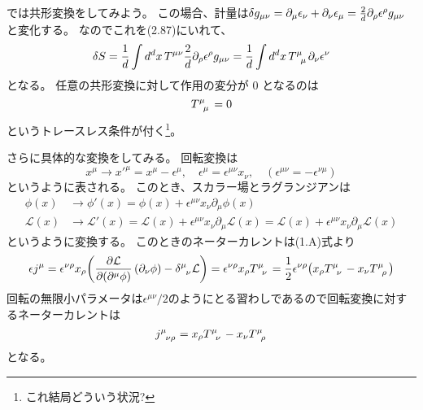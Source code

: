 \documentclass[../../master.tex]{subfiles}
\begin{document}
では共形変換をしてみよう。
この場合、計量は\(\var{g_{\mu\nu}}=\partial_\mu\epsilon_\nu+\partial_\nu\epsilon_\mu=\frac{2}{d}\partial_\rho \epsilon^\rho g_{\mu\nu}\)と変化する。
なのでこれを(2.87)にいれて、
\begin{equation}
    \var{S}
    = \frac{1}{d} \int d^dx\, T^{\mu\nu}\frac{2}{d}\partial_\rho \epsilon^\rho g_{\mu\nu}
    = \frac{1}{d}\int d^dx\, T\indices{^\mu_\mu}\partial_\nu\epsilon^\nu
\end{equation}
となる。
任意の共形変換に対して作用の変分が 0 となるのは
\begin{equation}
    T\indices{^\mu_\mu} =0
\end{equation}
というトレースレス条件が付く\footnote{これ結局どういう状況?}。

さらに具体的な変換をしてみる。
回転変換は
\begin{equation}
    x^\mu\rightarrow x'^\mu = x^\mu -\epsilon^\mu,\quad \epsilon^\mu = \epsilon^{\mu\nu}x_\nu, \quad(\epsilon^{\mu\nu}= - \epsilon^{\nu\mu})
\end{equation}
というように表される。
このとき、スカラー場とラグランジアンは
\begin{align}
    \phi(x)&\rightarrow \phi'(x) = \phi(x) + \epsilon^{\mu\nu}x_\nu\partial_\mu\phi(x)\\
    \mathcal{L}(x)&\rightarrow \mathcal{L}'(x)
    = \mathcal{L}(x) + \epsilon^{\mu\nu}x_\nu\partial_\mu\mathcal{L}(x)
    = \mathcal{L}(x) + \epsilon^{\mu\nu}x_\nu\partial_\mu\mathcal{L}(x)
\end{align}
というように変換する。
このときのネーターカレントは(1.A)式より
\begin{align*}
    \epsilon j^\mu
    = \epsilon^{\nu\rho}x_\rho\qty(\pdv{\mathcal{L}}{(\partial^\mu \phi)}\,(\partial_\nu \phi) - \delta\indices{^\mu_\nu}\mathcal{L})
    = \epsilon^{\nu\rho}x_\rho T\indices{^\mu_\nu}
    = \frac{1}{2}\epsilon^{\nu\rho}\qty(x_\rho T\indices{^\mu_\nu}-x_\nu T\indices{^\mu_\rho})
\end{align*}
回転の無限小パラメータは\(\epsilon^{\mu\nu}/2\)のようにとる習わしであるので回転変換に対するネーターカレントは
\begin{equation}
    j\indices{^\mu_\nu_\rho} = x_\rho T\indices{^\mu_\nu}-x_\nu T\indices{^\mu_\rho}
\end{equation}
となる。
\end{document}
